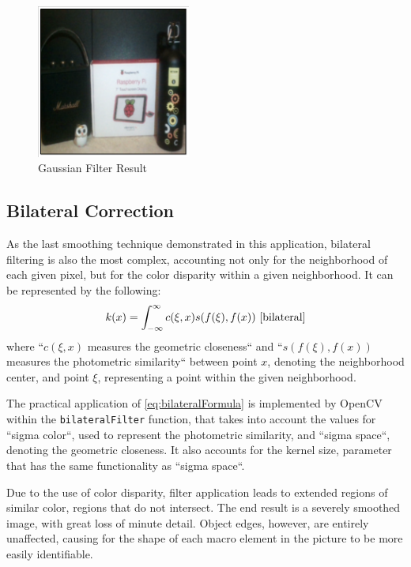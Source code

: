 \begin{figure}[H]
	\includegraphics[width=0.45\textwidth, height=0.45\textwidth]{resources/Gaussian_2.png}
	\caption{Gaussian Filter Result}
\end{figure}

\subsection{Bilateral Correction}

As the last smoothing technique demonstrated in this application, bilateral filtering is also the most
complex, accounting not only for the neighborhood of each given pixel, but for the color disparity within
a given neighborhood. It can be represented by the following:
\begin{equation}
	\label{eq:bilateralFormula}
	k(x) = \int_{-\infty}^{\infty} c(\xi, x) s(f(\xi), f(x))
	\text{ \cite{bilateral}}
\end{equation}
where ``\(c(\xi, x)\) measures the geometric closeness`` and ``\(s(f(\xi), f(x))\) measures the photometric
similarity`` between point \(x\), denoting the neighborhood center, and point \(\xi\), representing a point
within the given neighborhood. \cite{bilateral}

The practical application of \cref{eq:bilateralFormula} is implemented by OpenCV within the
\verb|bilateralFilter| function, that takes into account the values for ``sigma color``, used to represent
the photometric similarity, and ``sigma space``, denoting the geometric closeness. It also accounts for the
kernel size, parameter that has the same functionality as ``sigma space``. \cite{opencvImproc}

Due to the use of color disparity, filter application leads to extended regions of similar color, regions that
do not intersect. The end result is a severely smoothed image, with great loss of minute detail. Object edges,
however, are entirely unaffected, causing for the shape of each macro element in the picture to be more easily
identifiable.

